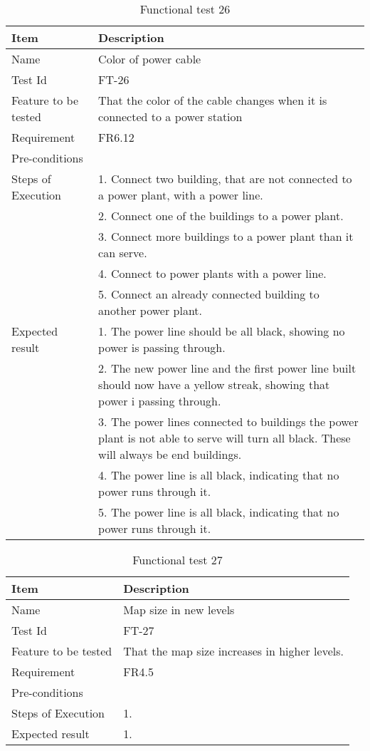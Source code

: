 \begin{table}[H]
\centering
	\begin{tabular}{ l | p{8cm} }
		\hline
		{\bf Item} & {\bf Description} \\ \hline
		Name &  Color of power cable \\ 
		Test Id & FT-26 \\ 
		Feature to be tested & That the color of the cable changes when it is connected to a power station \\ 
		Requirement & FR6.12 \\ 
		Pre-conditions &  \\ 
		Steps of Execution & 1. Connect two building, that are not connected to a power plant, with a power line. \\ 
		& 2. Connect one of the buildings to a power plant. \\
		& 3. Connect more buildings to a power plant than it can serve. \\
		& 4. Connect to power plants with a power line. \\
		& 5. Connect an already connected building to another power plant. \\
		Expected result & 1. The power line should be all black, showing no power is passing through. \\
		& 2. The new power line and the first power line built should now have a yellow streak, showing that power i passing through. \\
		& 3. The power lines connected to buildings the power plant is not able to serve will turn all black. These will always be end buildings. \\
		& 4. The power line is all black, indicating that no power runs through it. \\
		& 5. The power line is all black, indicating that no power runs through it. \\
	\end{tabular}
	\caption{Functional test 26}
\end{table}

\begin{table}[H]
\centering
	\begin{tabular}{ l | p{8cm} }
		\hline
		{\bf Item} & {\bf Description} \\ \hline
		Name & Map size in new levels \\ 
		Test Id & FT-27 \\ 
		Feature to be tested & That the map size increases in higher levels. \\ 
		Requirement & FR4.5 \\ 
		Pre-conditions & \\ 
		Steps of Execution & 1.  \\
		Expected result & 1. \\
	\end{tabular}
	\caption{Functional test 27}
\end{table}



